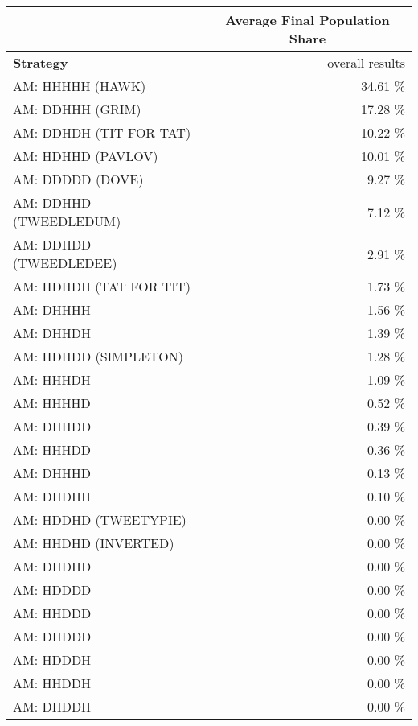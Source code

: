 \begin{tabular}{|l|r|}
\hline
 & \multicolumn{1}{c|}{{\bf Average Final Population Share}} \\
\hline
{\bf Strategy} & overall results\\ \hline
AM: HHHHH (HAWK)             &   34.61 \% \\
AM: DDHHH (GRIM)             &   17.28 \% \\
AM: DDHDH (TIT FOR TAT)      &   10.22 \% \\
AM: HDHHD (PAVLOV)           &   10.01 \% \\
AM: DDDDD (DOVE)             &    9.27 \% \\
AM: DDHHD (TWEEDLEDUM)       &    7.12 \% \\
AM: DDHDD (TWEEDLEDEE)       &    2.91 \% \\
AM: HDHDH (TAT FOR TIT)      &    1.73 \% \\
AM: DHHHH                    &    1.56 \% \\
AM: DHHDH                    &    1.39 \% \\
AM: HDHDD (SIMPLETON)        &    1.28 \% \\
AM: HHHDH                    &    1.09 \% \\
AM: HHHHD                    &    0.52 \% \\
AM: DHHDD                    &    0.39 \% \\
AM: HHHDD                    &    0.36 \% \\
AM: DHHHD                    &    0.13 \% \\
AM: DHDHH                    &    0.10 \% \\
AM: HDDHD (TWEETYPIE)        &    0.00 \% \\
AM: HHDHD (INVERTED)         &    0.00 \% \\
AM: DHDHD                    &    0.00 \% \\
AM: HDDDD                    &    0.00 \% \\
AM: HHDDD                    &    0.00 \% \\
AM: DHDDD                    &    0.00 \% \\
AM: HDDDH                    &    0.00 \% \\
AM: HHDDH                    &    0.00 \% \\
AM: DHDDH                    &    0.00 \% \\
\hline
\end{tabular}
